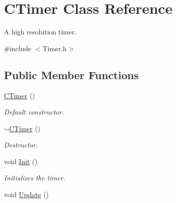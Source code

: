 \hypertarget{class_c_timer}{}\section{C\+Timer Class Reference}
\label{class_c_timer}


A high resolution timer.  




{\ttfamily \#include $<$Timer.\+h$>$}

\subsection*{Public Member Functions}
\begin{DoxyCompactItemize}
\item 
\hyperlink{class_c_timer_a93e4d770fd09f5e1b984768620cc52bf}{C\+Timer} ()\hypertarget{class_c_timer_a93e4d770fd09f5e1b984768620cc52bf}{}\label{class_c_timer_a93e4d770fd09f5e1b984768620cc52bf}

\begin{DoxyCompactList}\small\item\em Default constructor. \end{DoxyCompactList}\item 
\hyperlink{class_c_timer_afd3f6595928cd20f7faaece75f017733}{$\sim$\+C\+Timer} ()\hypertarget{class_c_timer_afd3f6595928cd20f7faaece75f017733}{}\label{class_c_timer_afd3f6595928cd20f7faaece75f017733}

\begin{DoxyCompactList}\small\item\em Destructor. \end{DoxyCompactList}\item 
void \hyperlink{class_c_timer_a775f01598e65e4d59409eb3514a8eb11}{Init} ()\hypertarget{class_c_timer_a775f01598e65e4d59409eb3514a8eb11}{}\label{class_c_timer_a775f01598e65e4d59409eb3514a8eb11}

\begin{DoxyCompactList}\small\item\em Initializes the timer. \end{DoxyCompactList}\item 
void \hyperlink{class_c_timer_ad0bd5b01b4a6acfacb5a492ecffbad94}{Update} ()\hypertarget{class_c_timer_ad0bd5b01b4a6acfacb5a492ecffbad94}{}\label{class_c_timer_ad0bd5b01b4a6acfacb5a492ecffbad94}


\end{DoxyCompactItemize}

